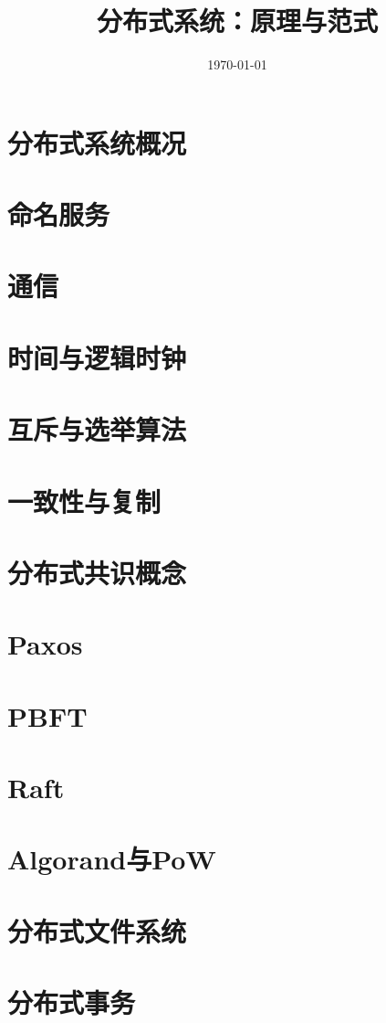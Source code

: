\documentclass[UTF8,a4paper,12pt,openany]{ctexbook}
\title{分布式系统：原理与范式}
\author{}
\date{\today}
\begin{document}
\makeatletter
{}\relax
\makeatother
\maketitle
\tableofcontents
\newpage

\chapter{分布式系统概况}


\chapter{命名服务}


\chapter{通信}


\chapter{时间与逻辑时钟}


\chapter{互斥与选举算法}


\chapter{一致性与复制}


\chapter{分布式共识概念}


\chapter{Paxos}


\chapter{PBFT}


\chapter{Raft}


\chapter{Algorand与PoW}


\chapter{分布式文件系统}


\chapter{分布式事务}

\end{document}

